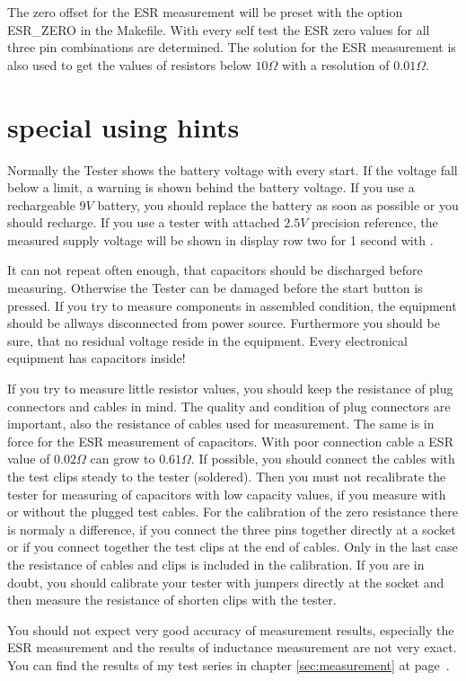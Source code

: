 The zero offset for the ESR measurement will be preset with the option ESR\_ZERO in the Makefile.
With every self test the ESR zero values for all three pin combinations are determined.
The solution for the ESR measurement is also used to get the values of resistors below \(10\Omega\) with
a resolution of \(0.01\Omega\).


\section{special using hints}
Normally the Tester shows the battery voltage with every start. If the voltage fall below a limit,
a warning is shown behind the battery voltage. If you use a rechargeable \(9V\) battery, you should replace
the battery as soon as possible or you should recharge.
If you use a tester with attached \(2.5V\) precision reference, the measured supply voltage will be shown
in display row two for 1 second with .

It can not repeat often enough, that capacitors should be discharged before measuring.
Otherwise the Tester can be damaged before the start button is pressed.
If you try to measure components in assembled condition, the equipment should be allways disconnected from power source.
Furthermore you should be sure, that no residual voltage reside in the equipment.
Every electronical equipment has capacitors inside!

If you try to measure little resistor values, you should keep the resistance of plug connectors and cables in mind.
The quality and condition of plug connectors are important, also the resistance of cables used for measurement.
The same is in force for the ESR measurement of capacitors.
With poor connection cable a ESR value of \(0.02\Omega\) can grow to \(0.61\Omega\).
If possible, you should connect the cables with the test clips steady to the tester (soldered).
Then you must not recalibrate the tester for measuring of capacitors with low capacity values,
if you measure with or without the plugged test cables. 
For the calibration of the zero resistance there is normaly a difference, if you connect the
three pins together directly at a socket or if you connect together the test clips at the end of cables.
Only in the last case the resistance of cables and clips is included in the calibration.
If you are in doubt, you should calibrate your tester with jumpers directly at the socket 
and then measure the resistance of shorten clips with the tester.

You should not expect very good accuracy of measurement results, especially the ESR measurement and the results of inductance measurement are not very exact.
You can find the results of my test series in chapter \ref{sec:measurement} at page~\pageref{sec:measurement}.

